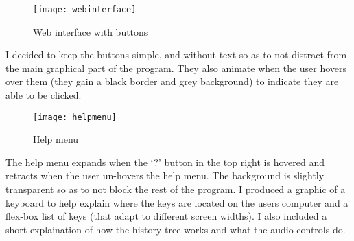 \begin{figure}[H]
    \centering
    \texttt{[image: webinterface]}
    \caption{Web interface with buttons}
\end{figure}

I decided to keep the buttons simple, and without text so as to not distract
from the main graphical part of the program. They also animate when the user
hovers over them (they gain a black border and grey background) to indicate they
are able to be clicked.

\begin{figure}[H]
    \centering
    \texttt{[image: helpmenu]}
    \caption{Help menu}
\end{figure}

The help menu expands when the `?' button in the top right is hovered and
retracts when the user un-hovers the help menu. The background is slightly
transparent so as to not block the rest of the program. I produced a graphic of
a keyboard to help explain where the keys are located on the users computer and
a flex-box list of keys (that adapt to different screen widths). I also included
a short explaination of how the history tree works and what the audio controls
do.
